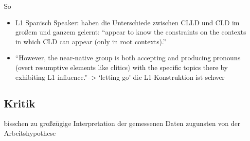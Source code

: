 So
\begin{itemize}
    \item L1 Spanisch Speaker: haben die Unterschiede zwischen CLLD und CLD im großem und ganzem gelernt: ``appear to know the constraints on the contexts in which CLD can appear (only in root contexts).''
    \item ``However, the near-native group is both accepting and producing pronouns (overt resumptive elements like clitics) with the specific topics there by exhibiting L1 influence.''--> `letting go' die L1-Konstruktion ist schwer
\end{itemize}


\subsection{Kritik}
bisschen zu großzügige Interpretation der gemessenen Daten zugunsten von der Arbeitshypothese



